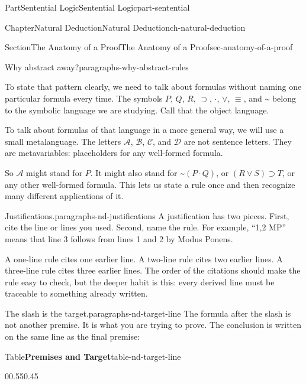 \documentclass[oneside,10pt,]{book}
\newcommand{\tabularfont}{\relax}
\newcommand{\terminology}[1]{\textbf{#1}}
\renewcommand{\terminology}[1]{#1}
\begin{document}
\begin{partptx}{Part}{Sentential Logic}{}{Sentential Logic}{}{}{part-sentential}
\begin{chapterptx}{Chapter}{Natural Deduction}{}{Natural Deduction}{}{}{ch-natural-deduction}
\begin{sectionptx}{Section}{The Anatomy of a Proof}{}{The Anatomy of a Proof}{}{}{sec-anatomy-of-a-proof}
\begin{paragraphs}{Why abstract away?}{paragraphs-why-abstract-rules}
\par
To state that pattern clearly, we need to talk about formulas without naming one particular formula every time. The symbols \(P\), \(Q\), \(R\), \(\supset\), \(\cdot\), \(\lor\), \(\equiv\), and \({\text{\textasciitilde}}\) belong to the symbolic language we are studying. Call that the \terminology{object language}.%
\par
To talk about formulas of that language in a more general way, we will use a small \terminology{metalanguage}. The letters \(\mathcal{A}\), \(\mathcal{B}\), \(\mathcal{C}\), and \(\mathcal{D}\) are not sentence letters. They are \terminology{metavariables}: placeholders for any well-formed formula.%
\par
So \(\mathcal{A}\) might stand for \(P\). It might also stand for \({\text{\textasciitilde}}(P \cdot Q)\), or \((R \lor S) \supset T\), or any other well-formed formula. This lets us state a rule once and then recognize many different applications of it.%
\end{paragraphs}%
\begin{paragraphs}{Justifications.}{paragraphs-nd-justifications}%
A justification has two pieces. First, cite the line or lines you used. Second, name the rule. For example, ``1,2 MP'' means that line 3 follows from lines 1 and 2 by Modus Ponens.%
\par
A one-line rule cites one earlier line. A two-line rule cites two earlier lines. A three-line rule cites three earlier lines. The order of the citations should make the rule easy to check, but the deeper habit is this: every derived line must be traceable to something already written.%
\end{paragraphs}%
\begin{paragraphs}{The slash is the target.}{paragraphs-nd-target-line}%
The formula after the slash is not another premise. It is what you are trying to prove.  The conclusion is written on the same line as the final premise:%
\begin{tableptx}{Table}{\textbf{Premises and Target}}{table-nd-target-line}{}%
\begin{tabularbox}{0}{0.55}{0.45}%
\resizebox{\ifdim\width > \linewidth\linewidth\else\width\fi}{!}{%
{\tabularfont%
\begin{tabular}{lll}
1.&\(P \supset {\text{\textasciitilde}}S\)&\tabularnewline[0pt]
2.&\(S\)&\slash{} \({\text{\textasciitilde}}P\)
\end{tabular}
}%
}%
\end{tabularbox}%

\end{tableptx}
\end{paragraphs}
\end{sectionptx}
\end{chapterptx}
\end{partptx}
\end{document}
